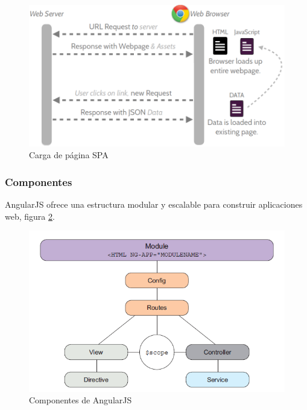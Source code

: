 		\newpage
		\begin{figure}[H]
		    \centering
			\includegraphics[width=18cm]{../imgs/ejemplos/2.png}
			\caption{Carga de página SPA}
			\label{figure:carga-spa}
		\end{figure}
		
		\newpage
		\subsubsection{Componentes}
			AngularJS ofrece una estructura modular y escalable para
			construir aplicaciones web, figura \ref{figure:angularjs-comp}.
			
			\begin{figure}[H]
			    \centering
				\includegraphics[width=18cm]{../imgs/ejemplos/angularjs-comp.png}
				\caption{Componentes de AngularJS}
				\label{figure:angularjs-comp}
			\end{figure}
			
